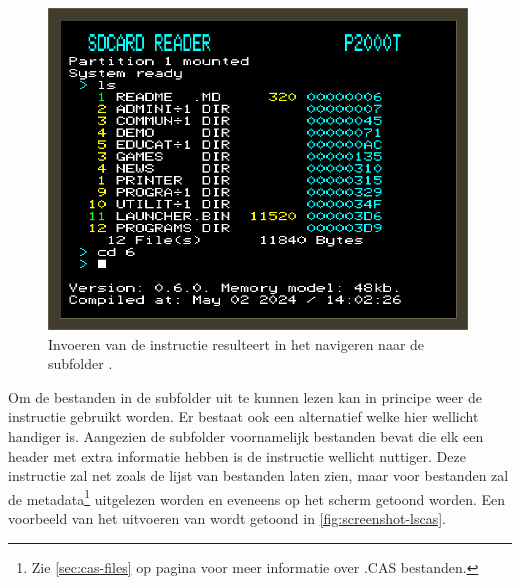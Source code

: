 \begin{figure}[h!]
    \centering
    \includegraphics[width=0.99\textwidth]{img/cd6.png}
    \caption{Invoeren van de instructie  resulteert in het navigeren naar de subfolder .}
    \label{fig:screenshot-cd6}
\end{figure}


Om de bestanden in de subfolder  uit te kunnen lezen kan in principe weer de instructie  gebruikt worden. Er bestaat ook een alternatief welke hier wellicht handiger is. Aangezien de subfolder  voornamelijk \cas bestanden bevat die elk een header met extra informatie hebben is de instructie  wellicht nuttiger. Deze instructie zal net zoals  de lijst van bestanden laten zien, maar voor \cas bestanden zal de metadata\footnote{Zie \cref{sec:cas-files} op pagina \pageref{sec:cas-files} voor meer informatie over .CAS bestanden.} uitgelezen worden en eveneens op het scherm getoond worden. Een voorbeeld van het uitvoeren van  wordt getoond in \cref{fig:screenshot-lscas}.

